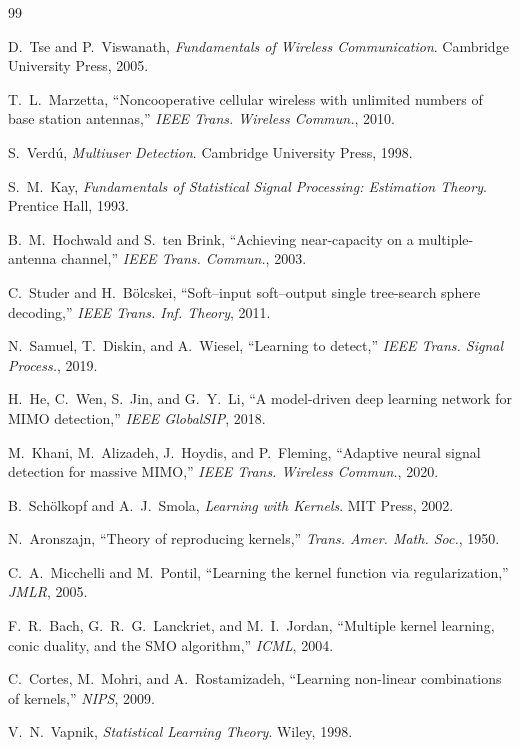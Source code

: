 \documentclass[12pt,a4paper,openany]{ctexrep}
\begin{document}
\begin{thebibliography}{99}

D.~Tse and P.~Viswanath,
\textit{Fundamentals of Wireless Communication}.
Cambridge University Press, 2005.

T.~L.~Marzetta,
``Noncooperative cellular wireless with unlimited numbers of base station antennas,''
\textit{IEEE Trans. Wireless Commun.}, 2010.

S.~Verdú,
\textit{Multiuser Detection}.
Cambridge University Press, 1998.

S.~M.~Kay,
\textit{Fundamentals of Statistical Signal Processing: Estimation Theory}.
Prentice Hall, 1993.

B.~M.~Hochwald and S.~ten Brink,
``Achieving near-capacity on a multiple-antenna channel,''
\textit{IEEE Trans. Commun.}, 2003.

C.~Studer and H.~B{\"o}lcskei,
``Soft--input soft--output single tree-search sphere decoding,''
\textit{IEEE Trans. Inf. Theory}, 2011.

N.~Samuel, T.~Diskin, and A.~Wiesel,
``Learning to detect,''
\textit{IEEE Trans. Signal Process.}, 2019.

H.~He, C.~Wen, S.~Jin, and G.~Y.~Li,
``A model-driven deep learning network for MIMO detection,''
\textit{IEEE GlobalSIP}, 2018.

M.~Khani, M.~Alizadeh, J.~Hoydis, and P.~Fleming,
``Adaptive neural signal detection for massive MIMO,''
\textit{IEEE Trans. Wireless Commun.}, 2020.

B.~Sch{\"o}lkopf and A.~J.~Smola,
\textit{Learning with Kernels}.
MIT Press, 2002.

N.~Aronszajn,
``Theory of reproducing kernels,''
\textit{Trans. Amer. Math. Soc.}, 1950.

C.~A.~Micchelli and M.~Pontil,
``Learning the kernel function via regularization,''
\textit{JMLR}, 2005.

F.~R.~Bach, G.~R.~G.~Lanckriet, and M.~I.~Jordan,
``Multiple kernel learning, conic duality, and the SMO algorithm,''
\textit{ICML}, 2004.

C.~Cortes, M.~Mohri, and A.~Rostamizadeh,
``Learning non-linear combinations of kernels,''
\textit{NIPS}, 2009.

V.~N.~Vapnik,
\textit{Statistical Learning Theory}.
Wiley, 1998.


\end{thebibliography}
\end{document}
